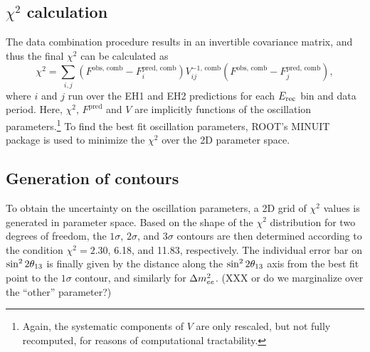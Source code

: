 \documentclass[../thesis.tex]{subfiles}
\begin{document}
\begin{comment}
The far site prediction is summed across the four far ADs.
\end{comment}

\begin{comment}
The far site data is summed across the four far ADs.
\end{comment}

\begin{comment}
See CombineMatrix in Predictor.cc.
\end{comment}

\begin{comment}
Correlations are implemented at the level of the toy MC.
\end{comment}
\subsection{$\chi^2$ calculation}
\label{sec:fitChi2}

The data combination procedure results in an invertible covariance matrix, and thus the final $\chi^2$ can be calculated as
\begin{equation*}
  \chi^2 = \sum_{i,j} (F^{\mathrm{obs},\,\mathrm{comb}} - F^{\mathrm{pred},\,\mathrm{comb}}_i) V^{-1,\,\mathrm{comb}}_{ij} (F^{\mathrm{obs},\,\mathrm{comb}} - F^{\mathrm{pred},\,\mathrm{comb}}_j),
\end{equation*}
where $i$ and $j$ run over the EH1 and EH2 predictions for each $E_\mathrm{rec}$ bin and data period. Here, $\chi^2$, $F^{\mathrm{pred}}$ and $V$ are implicitly functions of the oscillation parameters.\footnote{Again, the systematic components of $V$ are only rescaled, but not fully recomputed, for reasons of computational tractability.} To find the best fit oscillation parameters, ROOT's MINUIT package is used to minimize the $\chi^2$ over the 2D parameter space.

\begin{comment}
Just take $(Fpred_i - Fobs_i)V^{-1}_{ij}(Fpred_j - Fobs_j)$
\end{comment}

\subsection{Generation of contours}
\label{sec:fitContours}

To obtain the uncertainty on the oscillation parameters, a 2D grid of $\chi^2$ values is generated in parameter space. Based on the shape of the $\chi^2$ distribution for two degrees of freedom, the $1\sigma$, $2\sigma$, and $3\sigma$ contours are then determined according to the condition $\chi^2 = 2.30$, 6.18, and 11.83, respectively. The individual error bar on $\sin^2 2\theta_{13}$ is finally given by the distance along the $\sin^2 2\theta_{13}$ axis from the best fit point to the $1\sigma$ contour, and similarly for $\Delta m^2_{ee}$. (XXX or do we marginalize over the ``other'' parameter?)

\begin{comment}
Generate map of chi2 in oscillation parameter space. Take the 1sigma contour based on where the chi2 falls to XXX, etc.
\end{comment}
\end{document}

